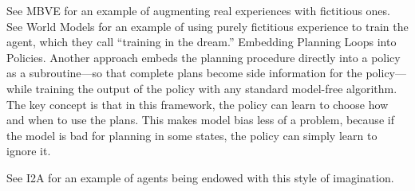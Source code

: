 See MBVE for an example of augmenting real experiences with fictitious ones.
See World Models for an example of using purely fictitious experience to train the agent, which they call “training in the dream.”
Embedding Planning Loops into Policies. Another approach embeds the planning procedure directly into a policy as a subroutine—so that complete plans become side information for the policy—while training the output of the policy with any standard model-free algorithm. The key concept is that in this framework, the policy can learn to choose how and when to use the plans. This makes model bias less of a problem, because if the model is bad for planning in some states, the policy can simply learn to ignore it.

See I2A for an example of agents being endowed with this style of imagination.